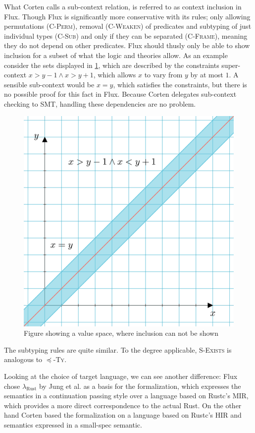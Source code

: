 What Corten calls a sub-context relation, is referred to as context inclusion in Flux.
Though Flux is significantly more conservative with its rules; only allowing permutations (\textsc{C-Perm}), removal (\textsc{C-Weaken}) of predicates and subtyping of just individual types (\textsc{C-Sub}) and only if they can be separated (\textsc{C-Frame}), meaning they do not depend on other predicates.
Flux should thusly only be able to show inclusion for a subset of what the logic and theories allow.
As an example consider the sets displayed in \cref{fig:flux-context-space}, which are described by the constraints super-context $x > y - 1 \wedge x > y + 1$, which allows $x$ to vary from $y$ by at most $1$. A sensible sub-context would be $x=y$, which satisfies the constraints, but there is no possible proof for this fact in Flux. 
Because Corten delegates sub-context checking to SMT, handling these dependencies are no problem.

\begin{figure}[h]
	\centering
	\includegraphics[width=0.5\linewidth]{../context-space.png}
	\caption{Figure showing a value space, where inclusion can not be shown}
	\label{fig:flux-context-space}
\end{figure}

The subtyping rules are quite similar. To the degree applicable, \textsc{S-Exists} is analogous to \textsc{$\preceq$-Ty}.

Looking at the choice of target language, we can see another difference: Flux chose $\lambda_{\text{Rust}}$ by Jung et al. \cite{jung_rustbelt_2018} as a basis for the formalization, which expresses the semantics in a continuation passing style over a language based on Rustc's MIR, which provides a more direct correspondence to the actual Rust.
On the other hand Corten based the formalization on a language based on Rustc's HIR and semantics expressed in a small-spec semantic. 

